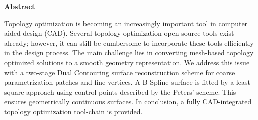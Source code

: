 

\clearemptydoublepage
{}
{}	





\vspace*{2cm}
\begin{center}
{\Large \bf Abstract}
\end{center}
\vspace{1cm}

Topology optimization is becoming an increasingly important tool in computer aided design (CAD). Several topology optimization open-source tools exist already; however,  it can still be cumbersome to incorporate these tools efficiently in the design process. The main challenge lies in converting mesh-based topology optimized solutions to a smooth geometry representation. We address this issue with a two-stage Dual Contouring surface reconstruction scheme for coarse parametrization patches and fine vertices. A B-Spline surface is fitted by a least-square approach using control points described by the Peters' scheme. This ensures geometrically continuous surfaces. In conclusion, a fully CAD-integrated topology optimization tool-chain is provided.